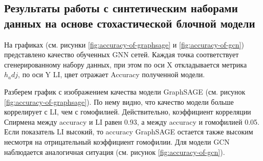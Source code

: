 \documentclass[a4paper,14pt]{article}
\begin{document}
	\subsection{Результаты работы с синтетическим наборами данных на основе стохастической блочной модели}

	На графиках (см. рисунки \ref{fig:accuracy-of-graphsage} и \ref{fig:accuracy-of-gcn}) представлено качество обученных GNN сетей.
	Каждая точка соответствует сгенерированному набору данных, при этом по оси X откладывается метрика $h_adj$, по оси Y LI, цвет отражает Accuracy полученной модели. 
	
	Разберем график с изображением качества модели GraphSAGE (см. рисунок \ref{fig:accuracy-of-graphsage}).
	По нему видно, что качество модели больше коррелирует с LI, чем с гомофилией.
	Действительно, коэффициент корреляции Спирмена между accuracy и LI равен 0.93, а между accuracy и гомофилией 0.05.
	Если показатель LI высокий, то accuracy GraphSAGE остается также высоким несмотря на отрицательный коэффициент гомофилии.
	Для модели GCN наблюдается аналогичная ситуация (см. рисунок \ref{fig:accuracy-of-gcn}).
\end{document}
